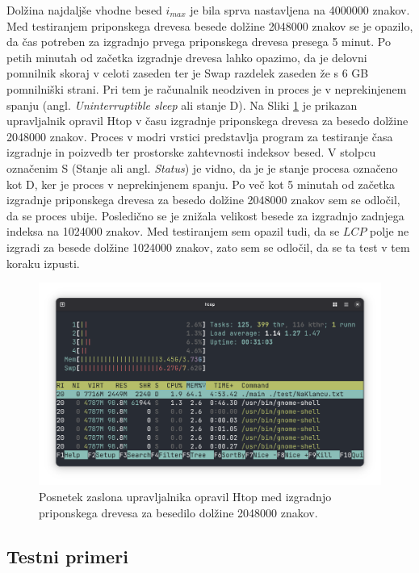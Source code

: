 Dolžina najdaljše vhodne besed $i_{max}$ je bila sprva nastavljena na 4000000 znakov. Med testiranjem priponskega drevesa besede dolžine 2048000 znakov se je opazilo, da čas potreben za izgradnjo prvega priponskega drevesa presega 5 minut. Po petih minutah od začetka izgradnje drevesa lahko opazimo, da je delovni pomnilnik skoraj v celoti zaseden ter je Swap razdelek zaseden že s 6 GB pomnilniški strani. Pri tem je računalnik neodziven in proces je v neprekinjenem spanju (angl. \textit{Uninterruptible sleep} ali stanje D). Na Sliki \ref{fig:6GB} je prikazan upravljalnik opravil Htop v času izgradnje priponskega drevesa za besedo dolžine 2048000 znakov. Proces v modri vrstici predstavlja program za testiranje časa izgradnje in poizvedb ter prostorske zahtevnosti indeksov besed. V stolpcu označenim S (Stanje ali angl. \textit{Status}) je vidno, da je je stanje procesa označeno kot D, ker je proces v neprekinjenem spanju. Po več kot 5 minutah od začetka izgradnje priponskega drevesa za besedo dolžine 2048000 znakov sem se odločil, da se proces ubije. Posledično se je znižala velikost besede za izgradnjo zadnjega indeksa na 1024000 znakov. Med testiranjem sem opazil tudi, da se $LCP$ polje ne izgradi za besede dolžine 1024000 znakov, zato sem se odločil, da se ta test v tem koraku izpusti.

\begin{figure}[tb]
    \centering
    \includegraphics[width=\textwidth]{Slike/Zaslonski posnetek 2025-06-23 22-53-56.png}

    \caption{Posnetek zaslona upravljalnika opravil Htop med izgradnjo priponskega drevesa za besedilo dolžine 2048000 znakov.} 
    \label{fig:6GB}
\end{figure}
\newpage

\subsection{Testni primeri}

